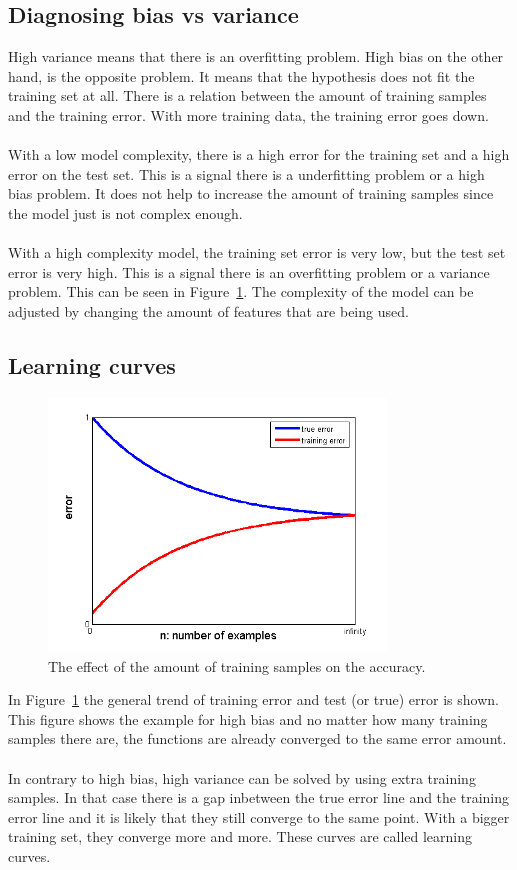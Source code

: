 \subsection{Diagnosing bias vs variance}
High variance means that there is an overfitting problem. High bias on the other hand, is the opposite problem. It means that the hypothesis does not fit the training set at all. There is a relation between the amount of training samples and the training error. With more training data, the training error goes down. \\\\
With a low model complexity, there is a high error for the training set and a high error on the test set. This is a signal there is a underfitting problem or a high bias problem. It does not help to increase the amount of training samples since the model just is not complex enough. \\\\
With a high complexity model, the training set error is very low, but the test set error is very high. This is a signal there is an overfitting problem or a variance problem. This can be seen in Figure~\ref{fig:trainingsamples}. The complexity of the model can be adjusted by changing the amount of features that are being used. \cite{stanford}

\subsection{Learning curves}
\begin{figure}[H]
\centering
\includegraphics[width=0.8\textwidth]{Figures/bias_variance_chart}
\decoRule
\caption[Training samples comparison]{The effect of the amount of training samples on the accuracy.}
\label{fig:trainingsamples}
\end{figure}
\noindent In Figure~\ref{fig:trainingsamples} the general trend of training error and test (or true) error is shown. This figure shows the example for high bias and no matter how many training samples there are, the functions are already converged to the same error amount.\\\\
In contrary to high bias, high variance can be solved by using extra training samples. In that case there is a gap inbetween the true error line and the training error line and it is likely that they still converge to the same point. With a bigger training set, they converge more and more. These curves are called learning curves.

